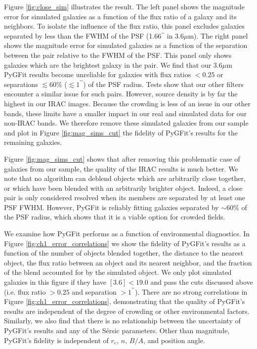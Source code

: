 \documentclass[apj]{emulateapj}
\newcommand{\sersic}{S\'{e}rsic}
\newcommand{\pygfit}{PyGFit}
\begin{document}
Figure \ref{fig:close_sim} illustrates the result.  The left panel shows the magnitude error for simulated galaxies as a function of the flux ratio of a galaxy and its neighbors.  To isolate the influence of the flux ratio, this panel excludes galaxies separated by less than the FWHM of the PSF (1.66$^{\prime\prime}$ in $3.6\mu$m).  The right panel shows the magnitude error for simulated galaxies as a function of the separation between the pair relative to the FWHM of the PSF.  This panel only shows galaxies which are the brightest galaxy in the pair.  We find that our $3.6\mu$m \pygfit{} results become unreliable for galaxies with flux ratios $<0.25$ or separations $\lesssim60\%$ ($\lesssim1^{\prime\prime}$) of the PSF radius.  Tests show that our other filters encounter a similar issue for such pairs.  However, source density is by far the highest in our IRAC images.  Because the crowding is less of an issue in our other bands, these limits have a smaller impact in our real and simulated data for our non-IRAC bands.  We therefore remove these simulated galaxies from our sample and plot in Figure \ref{fig:mag_sims_cut} the fidelity of \pygfit{}'s results for the remaining galaxies.

Figure \ref{fig:mag_sims_cut} shows that after removing this problematic case of galaxies from our sample, the quality of the IRAC results is much better.  We note that no algorithm can deblend objects which are arbitrarily close together, or which have been blended with an arbitrarily brighter object.  Indeed, a close pair is only considered resolved when its members are separated by at least one PSF FWHM.  However, \pygfit{} is reliably fitting galaxies separated by $\sim60\%$ of the PSF radius, which shows that it is a viable option for crowded fields.

We examine how \pygfit{} performs as a function of environmental diagnostics.  In Figure \ref{fig:ch1_error_correlations} we show the fidelity of \pygfit{}'s results as a function of the number of objects blended together, the distance to the nearest object, the flux ratio between an object and its nearest neighbor, and the fraction of the blend accounted for by the simulated object.  We only plot simulated galaxies in this figure if they have $[3.6] < 19.0$ and pass the cuts discussed above (i.e. flux ratio $>0.25$ and separation $>1^{\prime\prime}$).  There are no strong correlations in Figure \ref{fig:ch1_error_correlations}, demonstrating that the quality of \pygfit{}'s results are independent of the degree of crowding or other environmental factors.  Similarly, we also find that there is no relationship between the uncertainty of \pygfit{}'s results and any of the \sersic{} parameters.  Other than magnitude, \pygfit{}'s fidelity is independent of $r_e$, $n$, $B/A$, and position angle.
\end{document}
